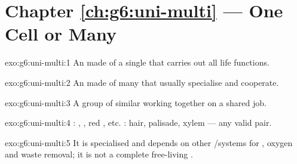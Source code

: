 \section*{Chapter \ref{ch:g6:uni-multi} --- One Cell or Many}

\begin{solution}{exo:g6:uni-multi:1}
An  made of a single  that carries out all life functions.
\end{solution}

\begin{solution}{exo:g6:uni-multi:2}
An  made of many  that usually specialise and cooperate.
\end{solution}

\begin{solution}{exo:g6:uni-multi:3}
A group of similar  working together on a shared job.
\end{solution}

\begin{solution}{exo:g6:uni-multi:4}
: , , red  , etc. :  hair, palisade,
xylem --- any valid pair.
\end{solution}

\begin{solution}{exo:g6:uni-multi:5}
It is specialised and depends on other /systems for , oxygen
and waste removal; it is not a complete free-living .
\end{solution}

